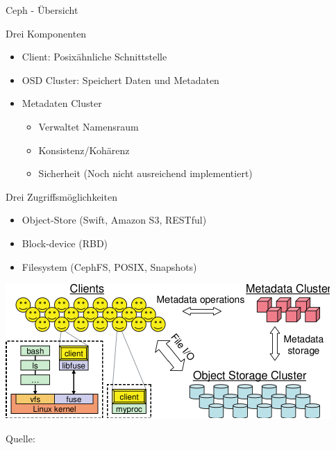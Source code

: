 \documentclass[hyperref={xetex}]{beamer}
\begin{document}
\begin{frame}{Ceph - \"Ubersicht}
	
  \begin{block}{Drei Komponenten}
	\begin{itemize}
        \item \alert{Client:} Posix\"ahnliche Schnittstelle %
        \item \alert{OSD Cluster:} Speichert Daten und Metadaten
        \item \alert{Metadaten Cluster}
			\begin{itemize}
				\item Verwaltet Namensraum
				\item Konsistenz/Koh\"arenz
				\item Sicherheit (Noch nicht ausreichend implementiert)
			\end{itemize}
	\end{itemize}
  \end{block}
  \begin{block}{Drei Zugriffsmöglichkeiten}
  \begin{itemize}
    \item Object-Store (Swift, Amazon S3, RESTful)
    \item Block-device (RBD)
    \item Filesystem (CephFS, POSIX, Snapshots)
  \end{itemize}
  \end{block}
\end{frame}

\begin{frame}
	\begin{center}
		\includegraphics{images/ceph_architecture.pdf}
	\end{center}
    Quelle: \cite{weil_ceph:_2006}
\end{frame}
\end{document}
